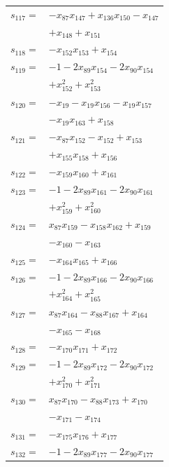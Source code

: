 \begin{longtable}{@{}r@{\;}l@{}}
\(s_{117}=\) & \(\displaystyle -x_{87}x_{147} +x_{136}x_{150} -x_{147}\) \\
 & \(\displaystyle +x_{148} +x_{151}\) \\[3pt]
\(s_{118}=\) & \(\displaystyle -x_{152}x_{153} +x_{154}\) \\[3pt]
\(s_{119}=\) & \(\displaystyle -1 -2x_{89}x_{154} -2x_{90}x_{154}\) \\
 & \(\displaystyle +x_{152}^{2} +x_{153}^{2}\) \\[3pt]
\(s_{120}=\) & \(\displaystyle -x_{19} -x_{19}x_{156} -x_{19}x_{157}\) \\
 & \(\displaystyle -x_{19}x_{163} +x_{158}\) \\[3pt]
\(s_{121}=\) & \(\displaystyle -x_{87}x_{152} -x_{152} +x_{153}\) \\
 & \(\displaystyle +x_{155}x_{158} +x_{156}\) \\[3pt]
\(s_{122}=\) & \(\displaystyle -x_{159}x_{160} +x_{161}\) \\[3pt]
\(s_{123}=\) & \(\displaystyle -1 -2x_{89}x_{161} -2x_{90}x_{161}\) \\
 & \(\displaystyle +x_{159}^{2} +x_{160}^{2}\) \\[3pt]
\(s_{124}=\) & \(\displaystyle x_{87}x_{159} -x_{158}x_{162} +x_{159}\) \\
 & \(\displaystyle -x_{160} -x_{163}\) \\[3pt]
\(s_{125}=\) & \(\displaystyle -x_{164}x_{165} +x_{166}\) \\[3pt]
\(s_{126}=\) & \(\displaystyle -1 -2x_{89}x_{166} -2x_{90}x_{166}\) \\
 & \(\displaystyle +x_{164}^{2} +x_{165}^{2}\) \\[3pt]
\(s_{127}=\) & \(\displaystyle x_{87}x_{164} -x_{88}x_{167} +x_{164}\) \\
 & \(\displaystyle -x_{165} -x_{168}\) \\[3pt]
\(s_{128}=\) & \(\displaystyle -x_{170}x_{171} +x_{172}\) \\[3pt]
\(s_{129}=\) & \(\displaystyle -1 -2x_{89}x_{172} -2x_{90}x_{172}\) \\
 & \(\displaystyle +x_{170}^{2} +x_{171}^{2}\) \\[3pt]
\(s_{130}=\) & \(\displaystyle x_{87}x_{170} -x_{88}x_{173} +x_{170}\) \\
 & \(\displaystyle -x_{171} -x_{174}\) \\[3pt]
\(s_{131}=\) & \(\displaystyle -x_{175}x_{176} +x_{177}\) \\[3pt]
\(s_{132}=\) & \(\displaystyle -1 -2x_{89}x_{177} -2x_{90}x_{177}\) \\

\end{longtable}
